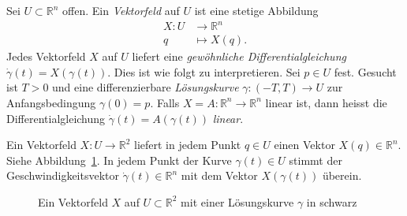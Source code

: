 \documentclass[../main.tex]{subfiles}
\begin{document}
\begin{definition}
  Sei $U \subset \mathbb{R}^n$ offen.
  Ein \emph{Vektorfeld} auf $U$ ist eine stetige Abbildung
  \begin{align*}
    X \colon U & \to \mathbb{R}^n \\
    q & \mapsto X(q).
  \end{align*}
  Jedes Vektorfeld $X$ auf $U$ liefert eine
  \emph{gewöhnliche Differentialgleichung}
  $\dot \gamma(t) = X(\gamma(t))$.
  Dies ist wie folgt zu interpretieren.
  Sei $p \in U$ fest. Gesucht ist $T > 0$ 
  und eine differenzierbare  \emph{Lösungskurve}
  $\gamma  \colon (-T, T) \to U$ 
  zur Anfangsbedingung $\gamma(0) = p$.
  Falls $X = A \colon \mathbb{R}^n \to \mathbb{R}^n$ 
  linear ist, dann heisst die Differentialgleichung
  $\dot \gamma(t) = A(\gamma(t))$
  \emph{linear}.
\end{definition}

\begin{geometric}
  Ein Vektorfeld $X \colon U \to \mathbb{R}^2$ 
  liefert in jedem Punkt $q \in U$ einen Vektor
  $X(q) \in \mathbb{R}^n$.
  Siehe Abbildung~\ref{fig:vectorfield}.
  In jedem Punkt der Kurve
  $\gamma(t) \in U$ stimmt der Geschwindigkeitsvektor
  $\dot \gamma(t) \in \mathbb{R}^n$ 
  mit dem Vektor $X(\gamma(t))$ überein.
\end{geometric}

\begin{figure}[ht]
    \centering
    \caption{Ein Vektorfeld $X$ auf $U \subset \mathbb{R}^2$
    mit einer Lösungskurve $\gamma$ in schwarz}%
    \label{fig:vectorfield}
\end{figure}

\newpage
\end{document}
